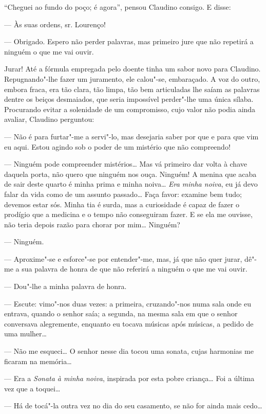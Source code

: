 ``Cheguei ao fundo do poço; é agora'', pensou Claudino consigo. E disse:

--- Às suas ordens, sr. Lourenço!

--- Obrigado. Espero não perder palavras, mas primeiro jure que não
repetirá a ninguém o que me vai ouvir.

Jurar! Até a fórmula empregada pelo doente tinha um sabor novo para
Claudino. Repugnando"-lhe fazer um juramento, ele calou"-se, embaraçado. A
voz do outro, embora fraca, era tão clara, tão limpa, tão bem
articuladas lhe saíam as palavras dentre os beiços desmaiados, que seria
impossível perder"-lhe uma única sílaba. Procurando evitar a solenidade
de um compromisso, cujo valor não podia ainda avaliar, Claudino
perguntou:

--- Não é para furtar"-me a servi"-lo, mas desejaria saber por que e para
que vim eu aqui. Estou agindo sob o poder de um mistério que não
compreendo!

--- Ninguém pode compreender mistérios\ldots{} Mas vá primeiro dar volta à
chave daquela porta, não quero que ninguém nos ouça. Ninguém! A menina
que acaba de sair deste quarto é minha prima e minha noiva\ldots{} \emph{Era
minha noiva}, eu já devo falar da vida como de um assunto passado\ldots{}
Faça favor: examine bem tudo; devemos estar sós. Minha tia é surda, mas
a curiosidade é capaz de fazer o prodígio que a medicina e o tempo não
conseguiram fazer. E se ela me ouvisse, não teria depois razão para
chorar por mim\ldots{} Ninguém?

--- Ninguém.

--- Aproxime"-se e esforce"-se por entender"-me, mas, já que não quer
jurar, dê"-me a sua palavra de honra de que não referirá a ninguém o que
me vai ouvir.

--- Dou"-lhe a minha palavra de honra.

--- Escute: vimo"-nos duas vezes: a primeira, cruzando"-nos numa sala onde
eu entrava, quando o senhor saía; a segunda, na mesma sala em que o
senhor conversava alegremente, enquanto eu tocava músicas após músicas,
a pedido de uma mulher\ldots{}

--- Não me esqueci\ldots{} O senhor nesse dia tocou uma sonata, cujas
harmonias me ficaram na memória\ldots{}

--- Era a \emph{Sonata à minha noiva}, inspirada por esta pobre
criança\ldots{} Foi a última vez que a toquei\ldots{}

--- Há de tocá"-la outra vez no dia do seu casamento, se não for ainda
mais cedo\ldots{}

